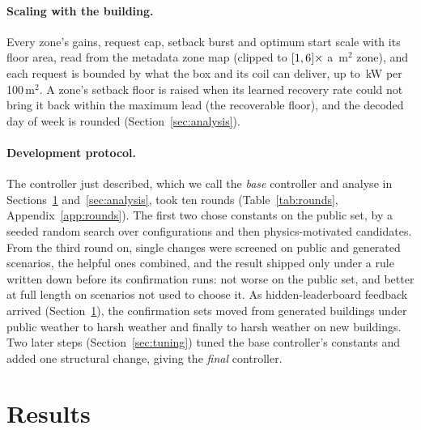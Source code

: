 \documentclass{article}
\begin{document}
\paragraph{Scaling with the building.} Every zone's gains, request cap, setback burst and optimum start scale with its floor area, read from the metadata zone map (clipped to $[1, 6]\times$ a \ParAreaRef\,m$^2$ zone), and each request is bounded by what the box and its coil can deliver, up to \RFiveParQcapKw\,kW per 100\,m$^2$. A zone's setback floor is raised when its learned recovery rate could not bring it back within the maximum lead (the recoverable floor), and the decoded day of week is rounded (Section~\ref{sec:analysis}).

\paragraph{Development protocol.} The controller just described, which we call the \emph{base} controller and analyse in Sections~\ref{sec:results} and~\ref{sec:analysis}, took ten rounds (Table~\ref{tab:rounds}, Appendix~\ref{app:rounds}). The first two chose constants on the public set, by a seeded random search over \NTuneConfigs{} configurations and then \NCandV{} physics-motivated candidates. From the third round on, single changes were screened on public and generated scenarios, the helpful ones combined, and the result shipped only under a rule written down before its confirmation runs: not worse on the public set, and better at full length on scenarios not used to choose it. As hidden-leaderboard feedback arrived (Section~\ref{sec:results}), the confirmation sets moved from generated buildings under public weather to harsh weather and finally to harsh weather on new buildings. Two later steps (Section~\ref{sec:tuning}) tuned the base controller's constants and added one structural change, giving the \emph{final} controller.

\section{Results}
\label{sec:results}
\end{document}
